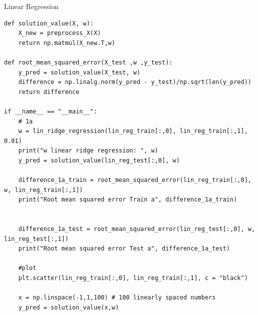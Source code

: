 \begin{task}{Linear Regression}
\begin{subtask}
\begin{enumerate}
\begin{lstlisting}
def solution_value(X, w):
    X_new = preprocess_X(X)
    return np.matmul(X_new.T,w)
    
def root_mean_squared_error(X_test ,w ,y_test):
    y_pred = solution_value(X_test, w)
    difference = np.linalg.norm(y_pred - y_test)/np.sqrt(len(y_pred))
    return difference
    
if __name__ == "__main__":
    # 1a
    w = lin_ridge_regression(lin_reg_train[:,0], lin_reg_train[:,1], 0.01)
    print("w linear ridge regression: ", w)
    y_pred = solution_value(lin_reg_test[:,0], w)
    
    difference_1a_train = root_mean_squared_error(lin_reg_train[:,0], w, lin_reg_train[:,1])
    print("Root mean squared error Train a", difference_1a_train)
    
    
    difference_1a_test = root_mean_squared_error(lin_reg_test[:,0], w, lin_reg_test[:,1])
    print("Root mean squared error Test a", difference_1a_test)
    
    #plot
    plt.scatter(lin_reg_train[:,0], lin_reg_train[:,1], c = "black")
    
    x = np.linspace(-1,1,100) # 100 linearly spaced numbers
    y_pred = solution_value(x,w)
    

\end{lstlisting}
\end{enumerate}
\end{subtask}
\end{task}

